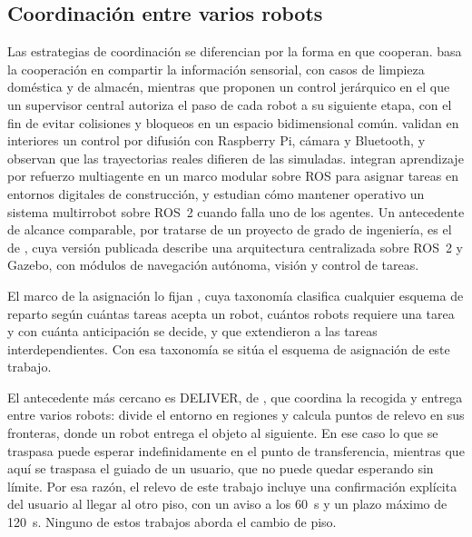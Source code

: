 \subsection{Coordinación entre varios robots}

Las estrategias de coordinación se diferencian por la forma en que cooperan.
\textcite{nair2024collaborative} basa la cooperación en compartir la información
sensorial, con casos de limpieza doméstica y de almacén, mientras que
\textcite{roszkowska2023multilevel} proponen un control jerárquico en el que un supervisor
central autoriza el paso de cada robot a su siguiente etapa, con el fin de evitar colisiones
y bloqueos en un espacio bidimensional común. \textcite{rudrusamy2022broadcast} validan en
interiores un control por difusión con Raspberry Pi, cámara y Bluetooth, y observan que las
trayectorias reales difieren de las simuladas. \textcite{xu2026modular} integran
aprendizaje por refuerzo multiagente en un marco modular sobre ROS para asignar tareas en
entornos digitales de construcción, y \textcite{zhang2025kubernetes} estudian cómo mantener
operativo un sistema multirrobot sobre ROS~2 cuando falla uno de los agentes. Un antecedente
de alcance comparable, por tratarse de un proyecto de grado de ingeniería, es el de
\textcite{piguave2023multirobot}, cuya versión publicada \autocite{yumbla2025open} describe
una arquitectura centralizada sobre ROS~2 y Gazebo, con módulos de navegación autónoma,
visión y control de tareas.

El marco de la asignación lo fijan \textcite{gerkey2004taxonomy}, cuya taxonomía clasifica
cualquier esquema de reparto según cuántas tareas acepta un robot, cuántos robots requiere
una tarea y con cuánta anticipación se decide, y que \textcite{korsah2013comprehensive}
extendieron a las tareas interdependientes. Con esa taxonomía se sitúa el esquema de
asignación de este trabajo.

El antecedente más cercano es DELIVER, de \textcite{srivastava2026deliver}, que coordina la
recogida y entrega entre varios robots: divide el entorno en regiones y calcula puntos de
relevo en sus fronteras, donde un robot entrega el objeto al siguiente. En ese caso lo que
se traspasa puede esperar indefinidamente en el punto de transferencia, mientras que aquí se
traspasa el guiado de un usuario, que no puede quedar esperando sin límite. Por esa razón, el
relevo de este trabajo incluye una confirmación explícita del usuario al llegar al otro piso,
con un aviso a los 60~s y un plazo máximo de 120~s. Ninguno de estos trabajos aborda el cambio
de piso.

